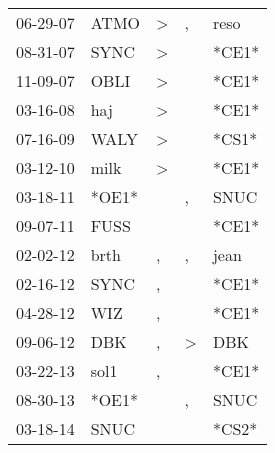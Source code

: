 \begin{supertabular}{p{0.07\textwidth}p{0.06\textwidth}p{0.02\textwidth}p{0.02\textwidth}p{0.06\textwidth}}
          06-29-07\textsuperscript{} &           ATMO\textsuperscript{} &     \textgreater &             , &           reso\textsuperscript{} \\
          08-31-07\textsuperscript{} &           SYNC\textsuperscript{} &     \textgreater &               &                            *CE1* \\
          11-09-07\textsuperscript{} &           OBLI\textsuperscript{} &     \textgreater &               &                            *CE1* \\
          03-16-08\textsuperscript{} &            haj\textsuperscript{} &     \textgreater &               &                            *CE1* \\
          07-16-09\textsuperscript{} &           WALY\textsuperscript{} &     \textgreater &               &                            *CS1* \\
          03-12-10\textsuperscript{} &           milk\textsuperscript{} &     \textgreater &               &                            *CE1* \\
          03-18-11\textsuperscript{} &                            *OE1* &                  &             , &           SNUC\textsuperscript{} \\
          09-07-11\textsuperscript{} &           FUSS\textsuperscript{} &                  &               &                            *CE1* \\
          02-02-12\textsuperscript{} &           brth\textsuperscript{} &                , &             , &           jean\textsuperscript{} \\
          02-16-12\textsuperscript{} &           SYNC\textsuperscript{} &                , &               &                            *CE1* \\
          04-28-12\textsuperscript{} &            WIZ\textsuperscript{} &                , &               &                            *CE1* \\
          09-06-12\textsuperscript{} &            DBK\textsuperscript{} &                , &  \textgreater &            DBK\textsuperscript{} \\
          03-22-13\textsuperscript{} &           sol1\textsuperscript{} &                , &               &                            *CE1* \\
          08-30-13\textsuperscript{} &                            *OE1* &                  &             , &           SNUC\textsuperscript{} \\
          03-18-14\textsuperscript{} &           SNUC\textsuperscript{} &                  &               &                            *CS2* \\

\end{supertabular}
